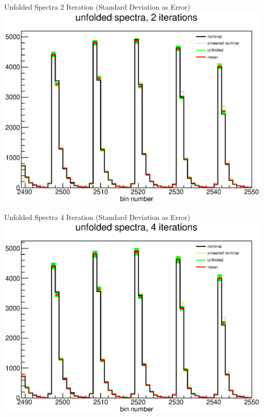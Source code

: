 \documentclass[aspectratio=169]{beamer}
\begin{document}
\begin{frame}{Unfolded Spectra 2 Iteration (Standard Deviation as Error)}
  \centering
  \includegraphics[height=\textheight]{figures/unfolded_pseudo_exps_iter2.eps}
\end{frame}

\begin{frame}{Unfolded Spectra 4 Iteration (Standard Deviation as Error)}
  \centering
  \includegraphics[height=\textheight]{figures/unfolded_pseudo_exps_iter4.eps}
\end{frame}
\end{document}
